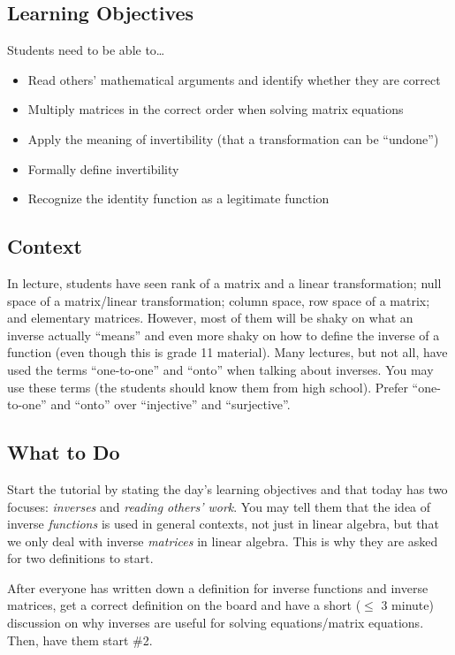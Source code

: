 \subsection*{Learning Objectives}
	Students need to be able to\ldots
	\begin{itemize}
		\item Read others' mathematical arguments and identify whether they are correct
		\item Multiply matrices in the correct order when solving matrix equations
		\item Apply the meaning of invertibility (that a transformation can be ``undone'')
		\item Formally define invertibility
		\item Recognize the identity function as a legitimate function
	\end{itemize}

\subsection*{Context}
	In lecture, students have seen rank of a matrix and a linear transformation; null space of a matrix/linear
		transformation;	column space, row space of a matrix; and elementary matrices. However, most
		of them will be shaky on what an inverse actually ``means'' and even more shaky on how to
		define the inverse of a function (even though this is grade 11 material). Many lectures,
		but not all, have used the terms ``one-to-one'' and ``onto'' when talking about inverses.
		You may use these terms (the students should know them from high school). Prefer ``one-to-one''
		and ``onto'' over ``injective'' and ``surjective''.

\subsection*{What to Do}
	Start the tutorial by stating the day's learning objectives and that today has two focuses: \emph{inverses}
		and \emph{reading others' work}. You may tell them that the idea of inverse \emph{functions} is used
		in general contexts, not just in linear algebra, but that we only
		deal with inverse \emph{matrices} in linear algebra. This is why they are asked for two
		definitions to start.

		After everyone has written down a definition for inverse functions and inverse matrices,
		get a correct definition on the board and have a short ($\leq $ 3 minute) discussion on why
		inverses are useful for solving equations/matrix equations. Then, have them start \#2.

